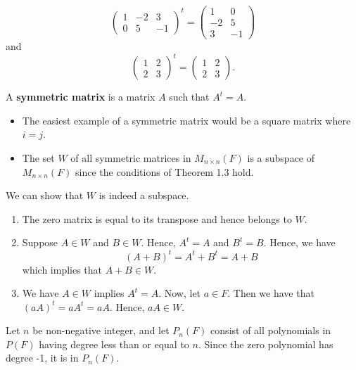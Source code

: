 \begin{eg}
    \[ \begin{pmatrix}
        1 & -2 & 3 \\
        0 & 5 & -1
    \end{pmatrix}^{t} =  \begin{pmatrix}
        1 & 0 \\ 
        -2 & 5 \\
        3 & -1
    \end{pmatrix}  \]
    and 
    \[  \begin{pmatrix}
        1 & 2 \\ 
        2 & 3 
        \end{pmatrix}^{t} = \begin{pmatrix}
            1 & 2 \\
            2 & 3
        \end{pmatrix}.\]
\end{eg}

\begin{definition}
    A \textbf{symmetric matrix} is a matrix \( A  \) such that \( A^{t} = A  \).
\end{definition}

\begin{itemize}
    \item The easiest example of a symmetric matrix would be a square matrix where \( i = j  \). 
    \item The set \( W  \) of all symmetric matrices in \( M_{n \times n}(F ) \) is a subspace of \( M_{n \times n}(F)  \) since the conditions of Theorem 1.3 hold.
\end{itemize}

We can show that \( W  \) is indeed a subspace.

\begin{enumerate}
    \item The zero matrix is equal to its transpose and hence belongs to \( W  \).
    \item Suppose \( A \in W  \) and \( B \in W  \). Hence, \( A^{t} = A  \) and \( B^{t} = B  \). Hence, we have 
        \[  (A+B)^{t} = A^{t} + B^{t} = A + B \]
        which implies that \( A + B \in W  \).
    \item We have \( A \in W  \) implies \( A^{t} = A  \). Now, let \( a \in F  \). Then we have that \( (aA)^{t} = a A^{t} = aA  \). Hence, \( aA \in W  \).
\end{enumerate}

\begin{eg}
    Let \( n  \) be non-negative integer, and let \( P_{n}(F) \) consist of all polynomials in \( P(F) \) having degree less than or equal to \( n \). Since the zero polynomial has degree -1, it is in \( P_{n}(F) \). 
\end{eg}


